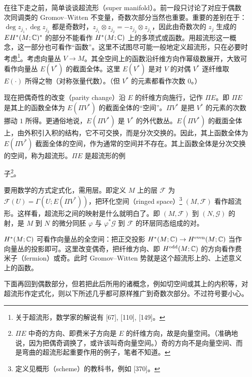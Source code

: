 
在往下走之前，简单谈谈超流形（super manifold）。前一段只讨论了对应于偶数次同调类的 Gromov–Witten 不变量，奇数次部分当然也重要。重要的差别在于：$\deg z_{j_1},\deg z_{j_2}$ 都是奇数时，$z_{j_1}\otimes z_{j_2}=-z_{j_2}\otimes z_{j_1}$，因此由奇数次的 $z_j$ 生成的 $EH^*(M;\mathbb{C})^*$ 的部分不能看作 $H^*(M;\mathbb{C})$ 上的多项式或函数。用超流形这一概念，这一部分也可看作“函数”。这里不试图尽可能一般地定义超流形，只在必要时考虑\footnote{关于超流形，数学家的解说有 [67], [110], [149]。}。考虑向量丛 $V\to M$。其全空间上的函数沿纤维方向作幂级数展开，大致可看作向量丛 $E(V^*)$ 的截面全体。这里 $E(V^*)$ 是对 $V$ 的对偶 $V^*$ 逐纤维取 $E(\cdot)$ 所得之物（对称张量代数）。（但 $V^*$ 的元素都看作次数 $0$。）

现在把偶奇性的改变（parity change）沿 $E$ 的纤维方向施行，记作 $\Pi E$。即 $\Pi E$ 是其上的函数全体为 $E(\Pi V^*)$ 的截面全体的“空间”。$\Pi V^*$ 是把 $V^*$ 的元素的次数挪动 $1$ 所得。更通俗地说，$E(\Pi V^*)$ 是 $V^*$ 的外代数丛。$E(\Pi V^*)$ 的截面全体上，由外积引入积的结构，它不可交换，而是分次交换的。因此，其上函数全体为 $E(\Pi V^*)$ 截面全体的空间，作为通常的空间并不存在。其上函数全体是分次交换的空间，称为超流形。$\Pi E$ 是超流形的例

子\footnote{$\Pi E$ 中奇的方向、即费米子方向是 $E$ 的纤维方向，故是向量空间。（准确地说，因为把偶奇调换了，或许该叫奇向量空间。）奇的方向不是向量空间、而是弯曲的超流形起重要作用的例子，笔者不知道。}。

要用数学的方式定式化，需用层。即定义 $M$ 上的层 $\mathcal{F}$ 为 $\mathcal{F}(U)=\Gamma(U;E(\Pi V^*))$，把环化空间（ringed space）\footnote{定义见概形（scheme）的教科书，例如 [370]。} $(M,\mathcal{F})$ 看作超流形。这样看，超流形之间的映射是什么就明白了。即 $(M,\mathcal{F})$ 到 $(N,\mathcal{G})$ 的射，是 $M$ 到 $N$ 的微分同胚 $\varphi$ 与 $\varphi^*\mathcal{G}$ 到 $\mathcal{F}$ 的环层同态组成的对。

$H^*(M;\mathbb{C})$ 可看作向量丛的全空间：把正交投影 $H^*(M;\mathbb{C})\to H^{\mathrm{even}}(M;\mathbb{C})$ 当作向量丛的投影即可。这里改变偶奇，把纤维方向、即 $H^{\mathrm{odd}}(M;\mathbb{C})$ 的方向看作费米子（fermion）或奇。此时 Gromov–Witten 势就是这个超流形上的、上述意义上的函数。

下面再回到偶数部分，但若把此后所用的诸概念，例如切空间或其上的内积等，对超流形作定式化，则以下所述几乎都可原样推广到奇数次部分。不过符号要小心。


